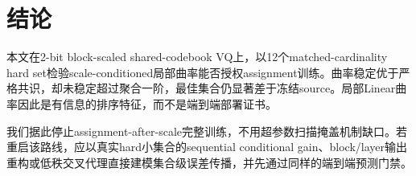 \section{结论}

本文在2-bit block-scaled shared-codebook VQ上，以12个matched-cardinality hard set检验scale-conditioned局部曲率能否授权assignment训练。曲率稳定优于严格共识，却未稳定超过聚合一阶，最佳集合仍显著差于冻结source。局部Linear曲率因此是有信息的排序特征，而不是端到端部署证书。

我们据此停止assignment-after-scale完整训练，不用超参数扫描掩盖机制缺口。若重启该路线，应以真实hard小集合的sequential conditional gain、block/layer输出重构或低秩交叉代理直接建模集合级误差传播，并先通过同样的端到端预测门禁。
